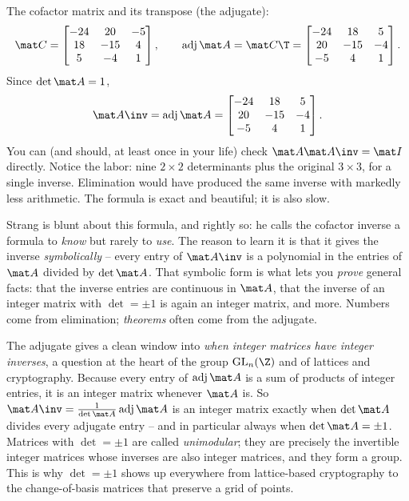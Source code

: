 The cofactor matrix and its transpose (the adjugate):
\[
\mat C=\begin{bmatrix} -24 & 20 & -5 \\ 18 & -15 & 4 \\ 5 & -4 & 1\end{bmatrix},
\qquad
\operatorname{adj}\mat A=\mat C\T=\begin{bmatrix} -24 & 18 & 5 \\ 20 & -15 & -4 \\ -5 & 4 & 1\end{bmatrix}.
\]
Since $\det\mat A=1$,
\[
\mat A\inv=\operatorname{adj}\mat A=\begin{bmatrix} -24 & 18 & 5 \\ 20 & -15 & -4 \\ -5 & 4 & 1\end{bmatrix}.
\]
You can (and should, at least once in your life) check $\mat A\mat A\inv=\mat I$ directly. Notice the
labor: nine $2\times2$ determinants plus the original $3\times3$, for a single inverse. Elimination
would have produced the same inverse with markedly less arithmetic. The formula is exact and
beautiful; it is also slow.

\begin{strangbox}
Strang is blunt about this formula, and rightly so: he calls the cofactor inverse a formula to
\emph{know} but rarely to \emph{use}. The reason to learn it is that it gives the inverse
\emph{symbolically} -- every entry of $\mat A\inv$ is a polynomial in the entries of $\mat A$ divided
by $\det\mat A$. That symbolic form is what lets you \emph{prove} general facts: that the inverse
entries are continuous in $\mat A$, that the inverse of an integer matrix with $\det=\pm1$ is again an
integer matrix, and more. Numbers come from elimination; \emph{theorems} often come from the
adjugate.
\end{strangbox}

\begin{connectionbox}
The adjugate gives a clean window into \emph{when integer matrices have integer inverses}, a question
at the heart of the group $\mathrm{GL}_n(\Z)$ and of lattices and cryptography. Because every entry of
$\operatorname{adj}\mat A$ is a sum of products of integer entries, it is an integer matrix whenever
$\mat A$ is. So $\mat A\inv=\frac{1}{\det\mat A}\operatorname{adj}\mat A$ is an integer matrix exactly
when $\det\mat A$ divides every adjugate entry -- and in particular always when $\det\mat A=\pm1$.
Matrices with $\det=\pm1$ are called \emph{unimodular}; they are precisely the invertible integer
matrices whose inverses are also integer matrices, and they form a group. This is why $\det=\pm1$
shows up everywhere from lattice-based cryptography to the change-of-basis matrices that preserve a
grid of points.
\end{connectionbox}

